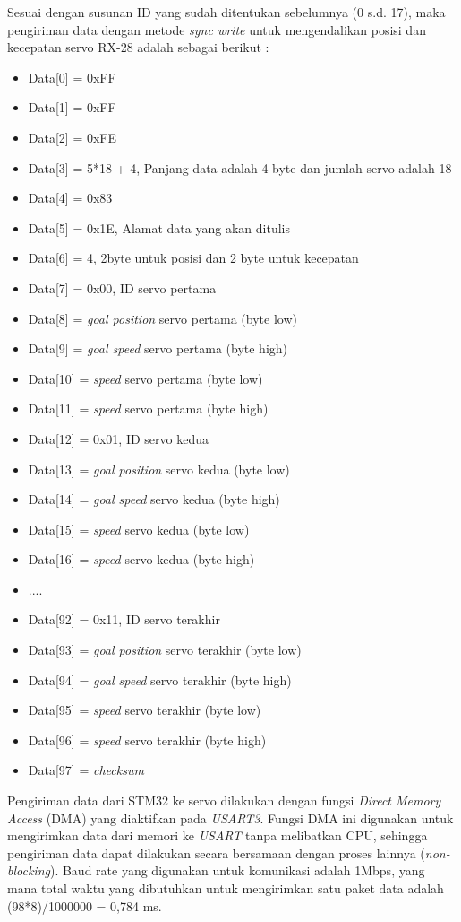 Sesuai dengan susunan ID yang sudah ditentukan sebelumnya (0 s.d. 17),
maka pengiriman data dengan metode \emph{sync write} untuk mengendalikan
posisi dan kecepatan servo RX-28 adalah sebagai berikut : 
\begin{itemize}
    \item Data[0] = 0xFF
    \item Data[1] = 0xFF
    \item Data[2] = 0xFE
    \item Data[3] = 5*18 + 4, Panjang data adalah 4 byte dan jumlah servo adalah 18
    \item Data[4] = 0x83
    \item Data[5] = 0x1E, Alamat data yang akan ditulis
    \item Data[6] = 4, 2byte untuk posisi dan 2 byte untuk kecepatan
    \item Data[7] = 0x00, ID servo pertama
    \item Data[8] = \emph{goal position} servo pertama (byte low)
    \item Data[9] = \emph{goal speed} servo pertama (byte high)
    \item Data[10] = \emph{speed} servo pertama (byte low)
    \item Data[11] = \emph{speed} servo pertama (byte high)
    \item  Data[12] = 0x01, ID servo kedua
    \item Data[13] = \emph{goal position} servo kedua (byte low)
    \item Data[14] = \emph{goal speed} servo kedua (byte high)
    \item Data[15] = \emph{speed} servo kedua (byte low)
    \item Data[16] = \emph{speed} servo kedua (byte high)
    \item ....
    \item Data[92] = 0x11, ID servo terakhir
    \item Data[93] = \emph{goal position} servo terakhir (byte low)
    \item Data[94] = \emph{goal speed} servo terakhir (byte high)
    \item Data[95] = \emph{speed} servo terakhir (byte low)
    \item Data[96] = \emph{speed} servo terakhir (byte high)
    \item Data[97] = \emph{checksum}
\end{itemize}
Pengiriman data dari STM32 ke servo dilakukan dengan fungsi \emph{Direct Memory
Access} (DMA) yang diaktifkan pada \emph{USART3}. Fungsi DMA ini digunakan untuk
mengirimkan data dari memori ke \emph{USART} tanpa melibatkan CPU, sehingga
pengiriman data dapat dilakukan secara bersamaan dengan proses lainnya
(\emph{non-blocking}). Baud rate yang digunakan untuk komunikasi adalah
1Mbps, yang mana total waktu yang dibutuhkan untuk mengirimkan satu paket data
adalah (98*8)/1000000 = 0,784 ms.

